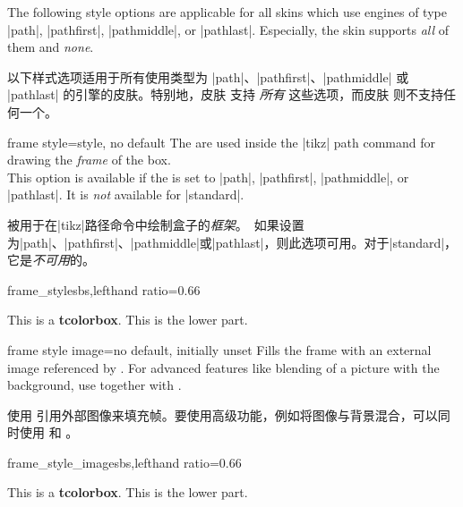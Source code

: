 The following style options are applicable for all skins which
use engines of type |path|, |pathfirst|, |pathmiddle|, or |pathlast|.
Especially, the skin  supports \emph{all} of them
and  \emph{none}.

以下样式选项适用于所有使用类型为 |path|、|pathfirst|、|pathmiddle| 或 |pathlast| 的引擎的皮肤。特别地，皮肤  支持 \emph{所有} 这些选项，而皮肤  则不支持任何一个。


\begin{docTcbKey}{frame style}{=}{style, no default}
The  are used inside the |tikz| path command
for drawing the \emph{frame} of the box.\\
This option is available if the  is set to
|path|, |pathfirst|, |pathmiddle|, or |pathlast|.
It is \emph{not} available for |standard|.

被用于在|tikz|路径命令中绘制盒子的\emph{框架}。\ 如果设置为|path|、|pathfirst|、|pathmiddle|或|pathlast|，则此选项可用。对于|standard|，它是\emph{不可用}的。
\begin{exdispExample*}{frame_style}{sbs,lefthand ratio=0.66}

\begin{tcolorbox}[enhanced,title=My title,
frame style={left color=red!75!black,
              right color=blue!75!black}]
This is a \textbf{tcolorbox}.
\tcblower
This is the lower part.
\end{tcolorbox}
\end{exdispExample*}
\end{docTcbKey}

\begin{docTcbKey}{frame style image}{=}{no default, initially unset}
Fills the frame with an external image referenced by .
For advanced features like blending of a picture with the background,
use  together with .

使用  引用外部图像来填充帧。要使用高级功能，例如将图像与背景混合，可以同时使用  和 。
\begin{exdispExample*}{frame_style_image}{sbs,lefthand ratio=0.66}

\begin{tcolorbox}[enhanced,title=My title,
  frame style image=blueshade.png]
This is a \textbf{tcolorbox}.
\tcblower
This is the lower part.
\end{tcolorbox}
\end{exdispExample*}
\end{docTcbKey}

